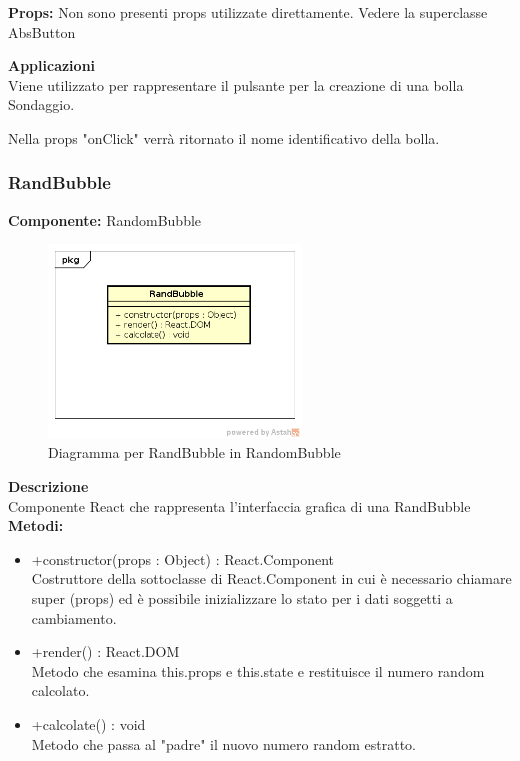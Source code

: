 \textbf{Props:} 
Non sono presenti props utilizzate direttamente. Vedere la superclasse AbsButton 


\textbf{Applicazioni}\\
Viene utilizzato per rappresentare il pulsante per la creazione di una bolla Sondaggio.

Nella props "onClick" verrà ritornato il nome identificativo della bolla. 


\clearpage

\subsubsection{RandBubble}
\textbf{Componente:}  RandomBubble\\
   \FloatBarrier
   \begin{figure}[ht]
   \centering
   \includegraphics[width=0.6\textwidth]{img/single-RandBubble.png}
   \caption{{Diagramma per RandBubble in RandomBubble}}
\end{figure}
\FloatBarrier
\textbf{Descrizione}\\
Componente React che rappresenta l'interfaccia grafica di una RandBubble
\\
\textbf{Metodi:} 
\begin{itemize}
\item +constructor(props : Object) : React.Component 
\\
Costruttore della sottoclasse di React.Component in cui è necessario chiamare super (props) ed è possibile inizializzare lo stato per i dati soggetti a cambiamento. 

\item +render() : React.DOM 
\\
Metodo che esamina this.props e this.state e restituisce il numero random calcolato. 

\item +calcolate() : void \\
Metodo che passa al "padre" il nuovo numero random estratto.
\end{itemize}

